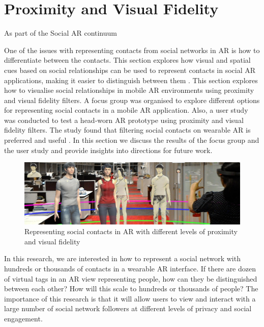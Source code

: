 \section{Proximity and Visual Fidelity}
\label{sec:contacts:visualising}

As part of the Social AR continuum

One of the issues with representing contacts from social networks in AR is how to differentiate between the contacts. This section explores how visual and spatial cues based on social relationships can be used to represent contacts in social AR applications, making it easier to distinguish between them  \cite{Nassani2017b}. This section explores how to visualise social relationships in mobile AR environments using proximity and visual fidelity filters. A focus group was organised to explore different options for representing social contacts in a mobile AR application. Also, a user study was conducted to test a head-worn AR prototype using proximity and visual fidelity filters. The study found that filtering social contacts on wearable AR is preferred and useful \cite{Nassani2017b}. In this section we discuss the results of the focus group and the user study and provide insights into directions for future work.

\begin{figure}[ht]
  \includegraphics[width=\linewidth]{images/mgia17/20170618_031128_HoloLens_cropped}
  \caption{Representing social contacts in AR with different levels of proximity and visual fidelity}
  \label{fig:contacts:overview}
\end{figure}

In this research, we are interested in how to represent a social network with hundreds or thousands of contacts in a wearable AR interface. If there are dozen of virtual tags in an AR view representing people, how can they be distinguished between each other? How will this scale to hundreds or thousands of people? The importance of this research is that it will allow users to view and interact with a large number of social network followers at different levels of privacy and social engagement.

